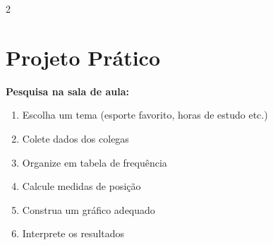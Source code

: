 \documentclass[11pt]{article}
\begin{document}
\begin{multicols}{2}
\section*{Projeto Prático}

\textbf{Pesquisa na sala de aula:}
\begin{enumerate}
\item Escolha um tema (esporte favorito, horas de estudo etc.)
\item Colete dados dos colegas
\item Organize em tabela de frequência
\item Calcule medidas de posição
\item Construa um gráfico adequado
\item Interprete os resultados
\end{enumerate}

\end{multicols}
\end{document}

